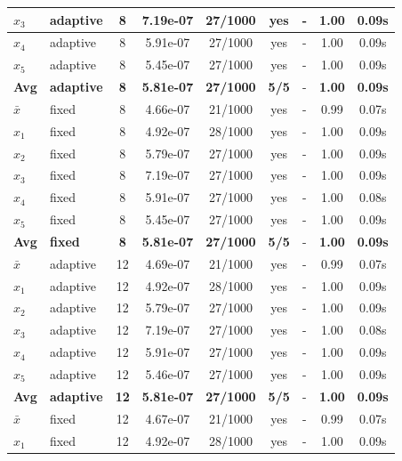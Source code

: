\begin{longtable}{|l|l|c|c|c|c|c|c|c|}
\hline
$x_3$ & adaptive & 8 & 7.19e-07 & 27/1000 & yes & - & 1.00 & 0.09s \\
\hline
$x_4$ & adaptive & 8 & 5.91e-07 & 27/1000 & yes & - & 1.00 & 0.09s \\
\hline
$x_5$ & adaptive & 8 & 5.45e-07 & 27/1000 & yes & - & 1.00 & 0.09s \\
\hline
\hline\hline
\textbf{Avg} & \textbf{adaptive} & \textbf{8} & \textbf{5.81e-07} & \textbf{27/1000} & \textbf{5/5} & - & \textbf{1.00} & \textbf{0.09s} \\
\hline\hline
\hline
$\bar{x}$ & fixed & 8 & 4.66e-07 & 21/1000 & yes & - & 0.99 & 0.07s \\
\hline
$x_1$ & fixed & 8 & 4.92e-07 & 28/1000 & yes & - & 1.00 & 0.09s \\
\hline
$x_2$ & fixed & 8 & 5.79e-07 & 27/1000 & yes & - & 1.00 & 0.09s \\
\hline
$x_3$ & fixed & 8 & 7.19e-07 & 27/1000 & yes & - & 1.00 & 0.09s \\
\hline
$x_4$ & fixed & 8 & 5.91e-07 & 27/1000 & yes & - & 1.00 & 0.08s \\
\hline
$x_5$ & fixed & 8 & 5.45e-07 & 27/1000 & yes & - & 1.00 & 0.09s \\
\hline
\hline\hline
\textbf{Avg} & \textbf{fixed} & \textbf{8} & \textbf{5.81e-07} & \textbf{27/1000} & \textbf{5/5} & - & \textbf{1.00} & \textbf{0.09s} \\
\hline\hline
$\bar{x}$ & adaptive & 12 & 4.69e-07 & 21/1000 & yes & - & 0.99 & 0.07s \\
\hline
$x_1$ & adaptive & 12 & 4.92e-07 & 28/1000 & yes & - & 1.00 & 0.09s \\
\hline
$x_2$ & adaptive & 12 & 5.79e-07 & 27/1000 & yes & - & 1.00 & 0.09s \\
\hline
$x_3$ & adaptive & 12 & 7.19e-07 & 27/1000 & yes & - & 1.00 & 0.08s \\
\hline
$x_4$ & adaptive & 12 & 5.91e-07 & 27/1000 & yes & - & 1.00 & 0.09s \\
\hline
$x_5$ & adaptive & 12 & 5.46e-07 & 27/1000 & yes & - & 1.00 & 0.09s \\
\hline
\hline\hline
\textbf{Avg} & \textbf{adaptive} & \textbf{12} & \textbf{5.81e-07} & \textbf{27/1000} & \textbf{5/5} & - & \textbf{1.00} & \textbf{0.09s} \\
\hline\hline
\hline
$\bar{x}$ & fixed & 12 & 4.67e-07 & 21/1000 & yes & - & 0.99 & 0.07s \\
\hline
$x_1$ & fixed & 12 & 4.92e-07 & 28/1000 & yes & - & 1.00 & 0.09s \\

\end{longtable}
